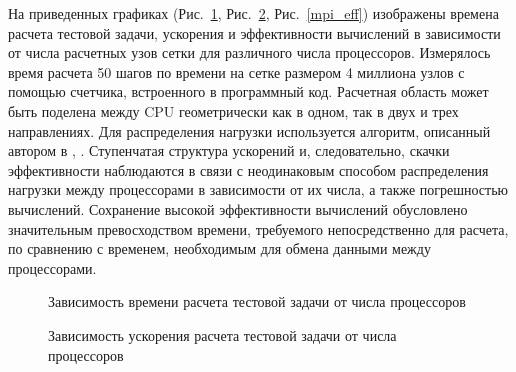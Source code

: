 На приведенных графиках (Рис.~\ref{mpi_times}, Рис.~\ref{mpi_speedup}, Рис.~\ref{mpi_eff}) изображены
времена расчета тестовой задачи, ускорения и эффективности вычислений в зависимости от числа расчетных узов сетки для 
различного числа процессоров.
Измерялось время расчета 50 шагов по времени на сетке размером 4 миллиона узлов
с помощью счетчика, встроенного в программный код.
Расчетная область может быть поделена между CPU геометрически как в одном, так в двух и трех направлениях.
Для распределения нагрузки используется алгоритм, описанный автором в \cite{MIPT-55}, \cite{Mathmod-2014}.
Ступенчатая структура ускорений и, следовательно, скачки эффективности наблюдаются
в связи с неодинаковым способом распределения нагрузки между процессорами
в зависимости от их числа, а также погрешностью вычислений. Сохранение высокой
эффективности вычислений обусловлено значительным превосходством времени, требуемого
непосредственно для расчета, по сравнению с временем, необходимым для обмена данными
между процессорами.

\begin{figure}
\begin{center}
\caption{Зависимость времени расчета тестовой задачи от числа процессоров}
\label{mpi_times}
\end{center}
\end{figure}

\begin{figure}
\begin{center}
\caption{Зависимость ускорения расчета тестовой задачи от числа процессоров}
\label{mpi_speedup}
\end{center}
\end{figure}

